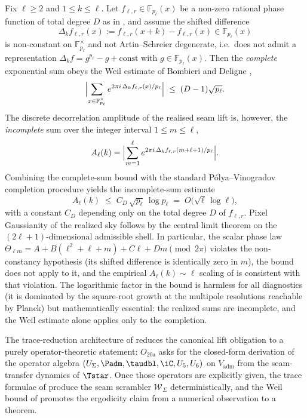 \begin{lemma}
\label{lem:decorrelation-weil-bound}
Fix $\ell\ge2$ and $1\le k\le\ell$. Let $f_{\ell,r}\in\mathbb F_{p_\ell}(x)$ be a non-zero rational
phase function of total degree $D$ as in , and assume the shifted
difference
\[
\Delta_k f_{\ell,r}(x):=f_{\ell,r}(x+k)-f_{\ell,r}(x)\in\mathbb F_{p_\ell}(x)
\]
is non-constant on $\mathbb F_{p_\ell}^\times$ and not Artin--Schreier degenerate, i.e.\ does not
admit a representation $\Delta_k f=g^{p_\ell}-g+\mathrm{const}$ with
$g\in\mathbb F_{p_\ell}(x)$. Then the \emph{complete} exponential sum obeys the Weil estimate of
Bombieri \cite{Bombieri1966} and Deligne \cite{DeligneWeil},
\[
\Bigl|\sum_{x\in\mathbb F_{p_\ell}^\times}
e^{2\pi i\,\Delta_k f_{\ell,r}(x)/p_\ell}\Bigr|
\;\le\;(D-1)\sqrt{p_\ell}.
\]
The discrete decorrelation amplitude of the realised seam lift is, however, the
\emph{incomplete} sum over the integer interval $1\le m\le\ell$,
\[
A_\ell(k)
=\Bigl|\sum_{m=1}^{\ell}
e^{2\pi i\,\Delta_k f_{\ell,r}(m+\ell+1)/p_\ell}\Bigr|.
\]
Combining the complete-sum bound with the standard P\'olya--Vinogradov
\cite{PolyaVinogradov} completion procedure yields the incomplete-sum estimate
\[
A_\ell(k)\;\le\;C_D\,\sqrt{p_\ell}\,\log p_\ell
\;=\;O\!\bigl(\sqrt{\ell}\,\log\ell\bigr),
\]
with a constant $C_D$ depending only on the total degree $D$ of $f_{\ell,r}$. Pixel Gaussianity of
the realized sky follows by the central limit theorem on the $(2\ell+1)$-dimensional admissible
shell. In particular, the scalar phase law
$\Theta_{\ell m}=A+B(\ell^2+\ell+m)+C\ell+Dm\pmod{2\pi}$ violates the non-constancy hypothesis
(its shifted difference is identically zero in $m$), the bound does not apply to it, and the
empirical $A_\ell(k)\sim\ell$ scaling of  is consistent with that
violation. The logarithmic factor in the bound is harmless for all
diagnostics (it is dominated by the
square-root growth at the multipole resolutions reachable by Planck) but mathematically essential:
the realized sums are incomplete, and the Weil estimate alone applies only to the completion.
\end{lemma}

\begin{remark}
\label{rem:o20a-operator-level}
The trace-reduction architecture of  reduces the canonical lift
obligation to a purely operator-theoretic statement: $O_{20\mathrm{a}}$ asks for the closed-form
derivation of the operator algebra $(U_\Sigma,\Padm,\taudbl,\iC,U_5,U_6)$ on $V_{\mathrm{adm}}$
from the seam-transfer dynamics of $\Tstar$. Once those operators are explicitly given, the trace
formulae of  produce the seam scrambler $\mathcal W_\Sigma$
deterministically, and the Weil bound of  promotes the
ergodicity claim from a numerical observation to a theorem.
\end{remark}

